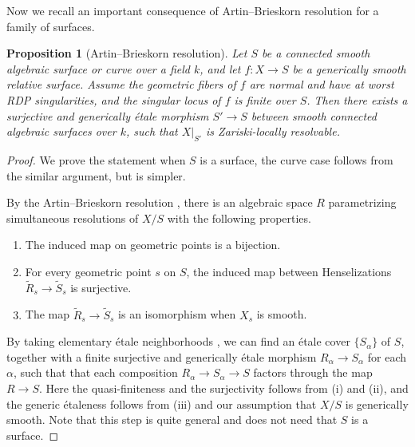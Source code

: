 \documentclass[11pt, letterpaper]{amsart}
\theoremstyle{plain}
\newtheorem{proposition}[theorem]{Proposition}
\theoremstyle{definition}
\newcommand{\<}{\langle}
\renewcommand{\>}{\rangle}
\def\wt{\widetilde}
\begin{document}
Now we recall an important consequence of Artin--Brieskorn resolution for a family of surfaces.
\begin{proposition}[Artin--Brieskorn resolution]
\label{lem: etale locally resolvable}
    Let $S$ be a connected smooth algebraic surface or curve over a field $k$, and let $f : X \to S$ be a generically smooth relative surface.
    Assume the geometric fibers of $f$ are normal and have at worst RDP singularities, and the singular locus of $f$ is finite over $S$.
    Then there exists a surjective and generically \'etale morphism $S' \to S$ between smooth connected algebraic surfaces over $k$, such that $X|_{S'}$ is Zariski-locally resolvable. 
\end{proposition}
\begin{proof}
    We prove the statement when $S$ is a surface, the curve case follows from the similar argument, but is simpler. 

    By the Artin--Brieskorn resolution \cite[p.~332]{Artin-Res}, there is an algebraic space $R$ parametrizing simultaneous resolutions of $X/S$ with the following properties. 
    \begin{enumerate}[label=\upshape{(\roman*)}]
        \item The induced map on geometric points is a bijection.
        \item For every geometric point $s$ on $S$, the induced map between Henselizations $\wt{R}_s \to \wt{S}_s$ is surjective.
        \item The map $\wt{R}_s \to \wt{S}_s$ is an isomorphism when $X_s$ is smooth.
    \end{enumerate}
  By taking elementary \'etale neighborhoods \cite[\href{https://stacks.math.columbia.edu/tag/0BGW}{Tag 0BGW}]{stacks-project}, we can find an \'etale cover $\{ S_\alpha \}$ of $S$, together with a finite surjective and generically \'etale morphism $R_\alpha \to S_\alpha$ for each $\alpha$, such that that each composition $R_\alpha \to S_\alpha \to S$ factors through the map $R\to S$. 
  Here the quasi-finiteness and the surjectivity follows from (i) and (ii), and the generic \'etaleness follows from (iii) and our assumption that $X/S$ is generically smooth. Note that this step is quite general and does not need that $S$ is a surface. 


\end{proof}
\end{document}
